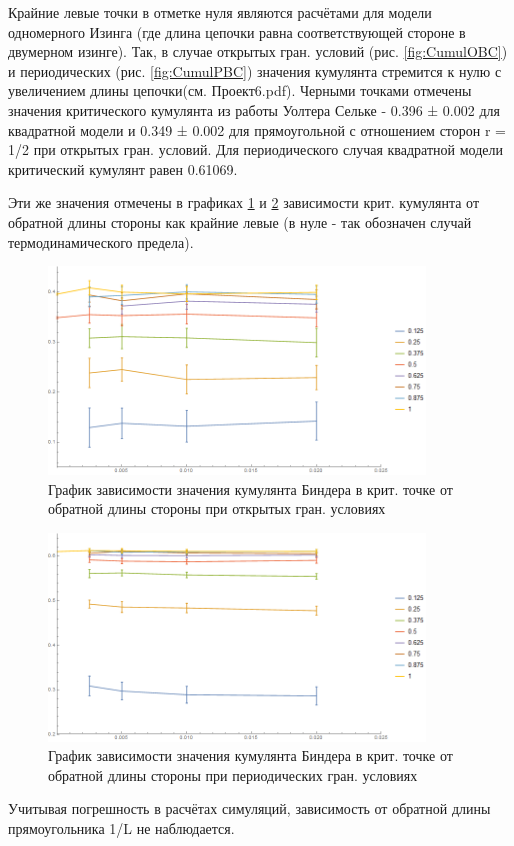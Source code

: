 Крайние левые точки в отметке нуля являются расчётами для модели одномерного Изинга (где длина цепочки равна соответствующей стороне в двумерном изинге). Так, в случае открытых гран. условий (рис. \ref{fig:CumulOBC}) и периодических (рис. \ref{fig:CumulPBC}) значения кумулянта стремится к нулю с увеличением длины цепочки(см. Проект6.pdf\cite{Git}).
Черными точками отмечены значения критического кумулянта из работы Уолтера Сельке - 0.396 ± 0.002 для квадратной модели и 0.349 ± 0.002 для прямоугольной с отношением сторон r = 1/2 при открытых гран. условий. Для периодического случая квадратной модели критический кумулянт равен 0.61069\cite{Selke}.

Эти же значения отмечены в графиках \ref{fig:CumulOBCL} и \ref{fig:CumulPBCL} зависимости крит. кумулянта от обратной длины стороны как крайние левые (в нуле - так обозначен случай термодинамического предела).

\begin{figure}[!h]
    \centering
    \includegraphics[width=100mm]{Sections/Images/CumulantOBCL.png}
    \caption{График зависимости значения кумулянта Биндера в крит. точке от обратной длины стороны при открытых гран. условиях}
    \label{fig:CumulOBCL}
\end{figure}

\begin{figure}[!h]
    \centering
    \includegraphics[width=100mm]{Sections/Images/CumulantPBCL.png}
    \caption{График зависимости значения кумулянта Биндера в крит. точке от обратной длины стороны при периодических гран. условиях}
    \label{fig:CumulPBCL}
\end{figure}

Учитывая погрешность в расчётах симуляций, зависимость от обратной длины прямоугольника 1/L не наблюдается.